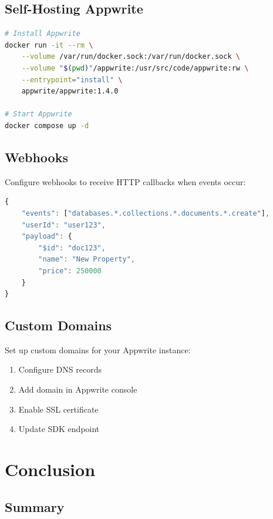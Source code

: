 \documentclass[11pt,a4paper,oneside]{book}
\begin{document}
\section{Self-Hosting Appwrite}

\begin{lstlisting}[language=bash, caption=Self-Host with Docker]
# Install Appwrite
docker run -it --rm \
    --volume /var/run/docker.sock:/var/run/docker.sock \
    --volume "$(pwd)"/appwrite:/usr/src/code/appwrite:rw \
    --entrypoint="install" \
    appwrite/appwrite:1.4.0

# Start Appwrite
docker compose up -d
\end{lstlisting}

\section{Webhooks}

Configure webhooks to receive HTTP callbacks when events occur:

\begin{lstlisting}[language=JavaScript, caption=Webhook Payload Example]
{
    "events": ["databases.*.collections.*.documents.*.create"],
    "userId": "user123",
    "payload": {
        "$id": "doc123",
        "name": "New Property",
        "price": 250000
    }
}
\end{lstlisting}

\section{Custom Domains}

Set up custom domains for your Appwrite instance:

\begin{enumerate}
    \item Configure DNS records
    \item Add domain in Appwrite console
    \item Enable SSL certificate
    \item Update SDK endpoint
\end{enumerate}

\chapter{Conclusion}

\section{Summary}
\end{document}
